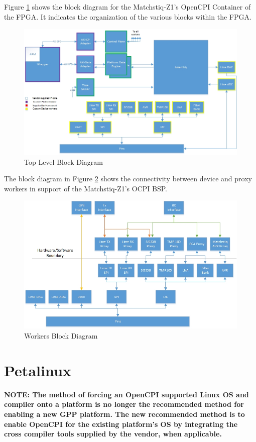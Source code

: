 \noindent Figure \ref{fig:toplevel} shows the block diagram for the Matchstiq-Z1's OpenCPI Container of the FPGA. It indicates the organization of the various blocks within the FPGA.
    \begin{figure}[H]
      \centerline{\includegraphics[scale=0.65]{matchstiq_BSP_toplevel}}
      \caption{Top Level Block Diagram}
      \label{fig:toplevel}
    \end{figure}

\pagebreak
\noindent The block diagram in Figure \ref{fig:workerlevel} shows the connectivity between device and proxy workers in support of the Matchstiq-Z1's OCPI BSP.
    \begin{figure}[H]
      \centerline{\includegraphics[scale=0.65]{matchstiq_BSP_worker}}
      \caption{Workers Block Diagram}
      \label{fig:workerlevel}
    \end{figure}

\section{Petalinux}
  \textbf{NOTE: The method of forcing an OpenCPI supported Linux OS and compiler onto a platform is no longer the recommended method for enabling a new GPP platform. The new recommended method is to enable OpenCPI for the existing platform's OS by integrating the cross compiler tools supplied by the vendor, when applicable.} \\


